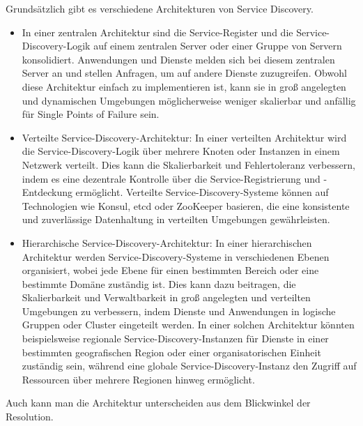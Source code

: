 Grundsätzlich gibt es verschiedene Architekturen von Service Discovery.
\begin{itemize}
\item In einer zentralen Architektur sind die Service-Register und die Service-Discovery-Logik auf einem zentralen Server oder einer Gruppe von Servern konsolidiert. Anwendungen und Dienste melden sich bei diesem zentralen Server an und stellen Anfragen, um auf andere Dienste zuzugreifen. Obwohl diese Architektur einfach zu implementieren ist, kann sie in groß angelegten und dynamischen Umgebungen möglicherweise weniger skalierbar und anfällig für Single Points of Failure sein.
\item Verteilte Service-Discovery-Architektur: In einer verteilten Architektur wird die Service-Discovery-Logik über mehrere Knoten oder Instanzen in einem Netzwerk verteilt. Dies kann die Skalierbarkeit und Fehlertoleranz verbessern, indem es eine dezentrale Kontrolle über die Service-Registrierung und -Entdeckung ermöglicht. Verteilte Service-Discovery-Systeme können auf Technologien wie Konsul, etcd oder ZooKeeper basieren, die eine konsistente und zuverlässige Datenhaltung in verteilten Umgebungen gewährleisten.

\item Hierarchische Service-Discovery-Architektur: In einer hierarchischen Architektur werden Service-Discovery-Systeme in verschiedenen Ebenen organisiert, wobei jede Ebene für einen bestimmten Bereich oder eine bestimmte Domäne zuständig ist. Dies kann dazu beitragen, die Skalierbarkeit und Verwaltbarkeit in groß angelegten und verteilten Umgebungen zu verbessern, indem Dienste und Anwendungen in logische Gruppen oder Cluster eingeteilt werden. In einer solchen Architektur könnten beispielsweise regionale Service-Discovery-Instanzen für Dienste in einer bestimmten geografischen Region oder einer organisatorischen Einheit zuständig sein, während eine globale Service-Discovery-Instanz den Zugriff auf Ressourcen über mehrere Regionen hinweg ermöglicht.
\end{itemize}

Auch kann man die Architektur unterscheiden aus dem Blickwinkel der Resolution. 

